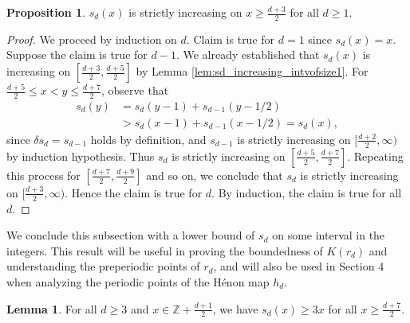 \documentclass[12pt]{amsart}
\theoremstyle{definition}
\newtheorem{lemma}[theorem]{Lemma}
\newtheorem{proposition}[theorem]{Proposition}
\begin{document}
 
 \begin{proposition}
    $s_{d}(x)$ is strictly increasing on $x \geq \frac{d+3}{2}$ for all $d\geq 1$.

    \label{prop_sd_strict_increasing}
 \end{proposition}
 \begin{proof}
 We proceed by induction on $d$. Claim is true for $d=1$ since $s_d(x) = x$. Suppose the claim is true for $d-1$. We already established that $s_d(x)$ is increasing on $[\frac{d+3}{2},\frac{d+5}{2}]$ by Lemma \ref{lem:sd_increasing_intvofsize1}. For $\frac{d+5}{2}\leq x<y\leq \frac{d+7}{2}$, observe that
    \begin{align*}
        s_d(y) &= s_d(y-1) + s_{d-1}(y-1/2) \\
        &> s_d(x-1) + s_{d-1}(x-1/2) = s_d(x),
    \end{align*}
    since $\delta s_{d} = s_{d-1}$ holds by definition, and $s_{d-1}$ is strictly increasing on $[\frac{d+2}{2},\infty)$ by induction hypothesis. Thus $s_d$ is strictly increasing on $[\frac{d+5}{2},\frac{d+7}{2}]$. Repeating this process for $[\frac{d+7}{2},\frac{d+9}{2}]$ and so on, we conclude that $s_d$ is strictly increasing on $[\frac{d+3}{2},\infty)$. Hence the claim is true for $d$. By induction, the claim is true for all $d$.
 \end{proof}

We conclude this subsection with a lower bound of $s_d$ on some interval in the integers. This result will be useful in proving the boundedness of $K(r_d)$ and understanding the preperiodic points of $r_d$, and will also be used in Section 4 when analyzing the periodic points of the H\'enon map $h_d$.

\begin{lemma}
    For all $d\geq 3$ and $x\in \mathbb{Z} + \frac{d+1}{2}$, we have $ s_d(x) \geq 3x$ for all $x\geq \frac{d+7}{2}$.

    \label{lem:3x_lowerbound_on_sd}
\end{lemma}
\end{document}
